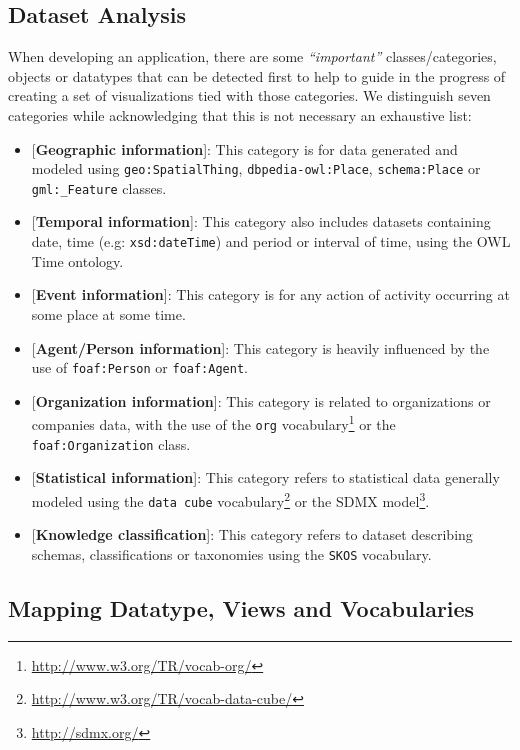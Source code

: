 \subsection{Dataset Analysis}
\label{sec:vizTypes}
When developing an application, there are some \textit{``important''} classes/categories, objects or datatypes that can be detected first to help to guide in the progress of creating a set of visualizations tied with those categories. We distinguish seven categories while acknowledging that this is not necessary an exhaustive list:
\begin{itemize}
 \item{[\textbf{Geographic information}]}: This category is for data generated and modeled using \texttt{geo:SpatialThing}, \texttt{dbpedia-owl:Place}, \texttt{schema:Place} or \texttt{gml:\_Feature} classes.
 \item{[\textbf{Temporal information}]}: This category also includes datasets containing date, time (e.g: \texttt{xsd:dateTime}) and period or interval of time, using the OWL Time ontology.
 \item{[\textbf{Event information}]}: This category is for any action of activity occurring at some place at some time.
 \item{[\textbf{Agent/Person information}]}: This category is heavily influenced by the use of \texttt{foaf:Person} or \texttt{foaf:Agent}.
 \item{[\textbf{Organization information}]}: This category is related to organizations or companies data, with the use of the \texttt{org} vocabulary\footnote{\url{http://www.w3.org/TR/vocab-org/}} or the \texttt{foaf:Organization} class.
 \item{[\textbf{Statistical information}]}: This category refers to statistical data generally modeled using the \texttt{data cube} vocabulary\footnote{\url{http://www.w3.org/TR/vocab-data-cube/}} or the SDMX model\footnote{\url{http://sdmx.org/}}.
 \item{[\textbf{Knowledge classification}]}: This category refers to dataset describing schemas, classifications or taxonomies using the \texttt{SKOS} vocabulary.
\end{itemize}


\subsection{Mapping Datatype, Views and Vocabularies}
\label{sec:mappingviz}


